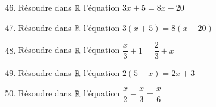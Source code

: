 \documentclass[oneside,12pt]{article}          %
\begin{document}
\begin{enumerate}\setcounter{enumi}{45}
	\item Résoudre dans ${\mathbb R}$ l'équation $3x + 5 = 8x - 20$
	\item Résoudre dans ${\mathbb R}$ l'équation $3(x + 5) = 8(x - 20)$
	\item Résoudre dans ${\mathbb R}$ l'équation $\dfrac{x}{3} + 1 = \dfrac{2}{3} + x$
	\item Résoudre dans ${\mathbb R}$ l'équation $2(5 + x) = 2x + 3$
	\item Résoudre dans ${\mathbb R}$ l'équation $\dfrac{x}{2} - \dfrac{x}{3} = \dfrac{x}{6}$
\end{enumerate}
\end{document}
